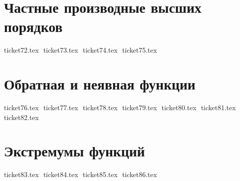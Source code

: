\section{Частные производные высших порядков}
{ticket72.tex}
$ $
{ticket73.tex}
$ $
{ticket74.tex}
$ $
{ticket75.tex}
$ $

\section{Обратная и неявная функции}
{ticket76.tex}
$ $
{ticket77.tex}
$ $
{ticket78.tex}
$ $
{ticket79.tex}
$ $
{ticket80.tex}
$ $
{ticket81.tex}
$ $
{ticket82.tex}
$ $

\section{Экстремумы функций}
{ticket83.tex}
$ $
{ticket84.tex}
$ $
{ticket85.tex}
$ $
{ticket86.tex}
$ $
